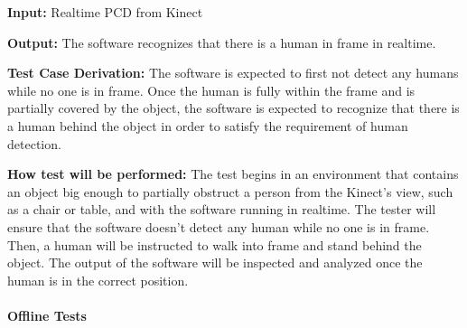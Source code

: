 \documentclass[12pt, titlepage]{article}
\begin{document}
\begin{enumerate}
\textbf{Input:} Realtime PCD from Kinect

\textbf{Output:} The software recognizes that there is a human in frame in realtime.

\textbf{Test Case Derivation:} The software is expected to first not detect any humans while no one is in frame. Once the human is fully within the frame and is partially covered by the object, the software is expected to recognize that there is a human behind the object in order to satisfy the requirement of human detection.

\textbf{How test will be performed:} The test begins in an environment that contains an object big enough to partially obstruct a person from the Kinect’s view, such as a chair or table, and with the software running in realtime. The tester will ensure that the software doesn't detect any human while no one is in frame. Then, a human will be instructed to walk into frame and stand behind the object. The output of the software will be inspected and analyzed once the human is in the correct position.


\end{enumerate}

\paragraph{Offline Tests}
\end{document}
